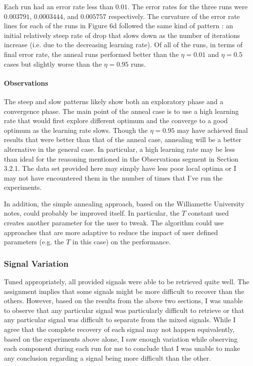 \documentclass{article} %
\begin{document}
Each run had an error rate less than \(0.01\). The error rates for the three runs were \(0.003791\), \(0.0003444\), and \(0.005757\) respectively. The curvature of the error rate lines for each of the runs in Figure 6d followed the same kind of pattern : an initial relatively steep rate of drop that slows down as the number of iterations increase (i.e. due to the decreasing learning rate). Of all of the runs, in terms of final error rate, the anneal runs performed better than the \(\eta=0.01\) and \(\eta=0.5\) cases but slightly worse than the \(\eta=0.95\) runs. 

\paragraph{Observations}

The steep and slow patterns likely show both an exploratory phase and a convergence phase. The main point of the anneal case is to use a high learning rate that would first explore different optimum and the converge to a good optimum as the learning rate slows. Though the \(\eta=0.95\) may have achieved final results that were better than that of the anneal case, annealing will be a better alternative in the general case. In particular, a high learning rate may be less than ideal for the reasoning mentioned in the Observations segment in Section 3.2.1. The data set provided here may simply have less poor local optima or I may not have encountered them in the number of times that I've run the experiments.

In addition, the simple annealing approach, based on the Williamette University notes, could probably be improved itself. In particular, the \(T\) constant used creates another parameter for the user to tweak. The algorithm could use approaches that are more adaptive to reduce the impact of user defined parameters (e.g. the \(T\) in this case) on the performance. 

\subsubsection{Signal Variation}

Tuned appropriately, all provided signals were able to be retrieved quite well. The assignment implies that some signals might be more difficult to recover than the others. However, based on the results from the above two sections, I was unable to observe that any particular signal was particularly difficult to retrieve or that any particular signal was difficult to separate from the mixed signals. While I agree that the complete recovery of each signal may not happen equivalently, based on the experiments above alone, I saw enough variation while observing each component during each run for me to conclude that I was unable to make any conclusion regarding a signal being more difficult than the other.
\end{document}

